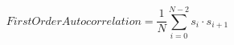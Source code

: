 \begin{equation}
\mathit{FirstOrderAutocorrelation} = \frac{1}{N} \sum_{i=0}^{N-2} s_i \cdot s_{i+1}
\label{eq:first_order_autocorrelation}
\end{equation}

